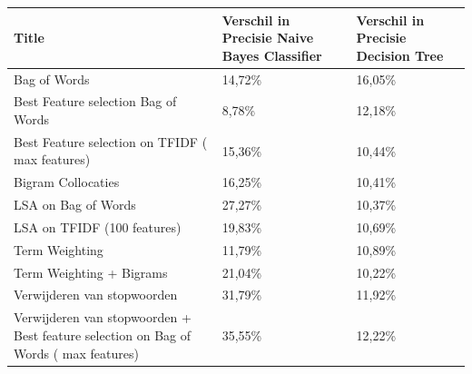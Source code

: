 \begin{table}[h]
\centering
\begin{adjustbox}{width=1\textwidth}
\begin{tabular}{|l|l|l|}
\hline
{\bf Title}                                                                          & {\bf Verschil in Precisie Naive Bayes Classifier} & {\bf Verschil in Precisie Decision Tree} \\ \hline
Bag of Words                                                                         & 14,72\%                                           & 16,05\%                                  \\ \hline
Best Feature selection Bag of Words                                                  & 8,78\%                                            & 12,18\%                                  \\ \hline
Best Feature selection on TFIDF ( max features)                                      & 15,36\%                                           & 10,44\%                                  \\ \hline
Bigram Collocaties                                                                   & 16,25\%                                           & 10,41\%                                  \\ \hline
LSA on Bag of Words                                                                  & 27,27\%                                           & 10,37\%                                  \\ \hline
LSA on TFIDF (100 features)                                                          & 19,83\%                                           & 10,69\%                                  \\ \hline
Term Weighting                                                                       & 11,79\%                                           & 10,89\%                                  \\ \hline
Term Weighting + Bigrams                                                             & 21,04\%                                           & 10,22\%                                  \\ \hline
Verwijderen van stopwoorden                                                          & 31,79\%                                           & 11,92\%                                  \\ \hline
Verwijderen van stopwoorden + Best feature selection on Bag of Words ( max features) & 35,55\%                                           & 12,22\%                                  \\ \hline

\end{tabular}
\end{adjustbox}
\end{table}
